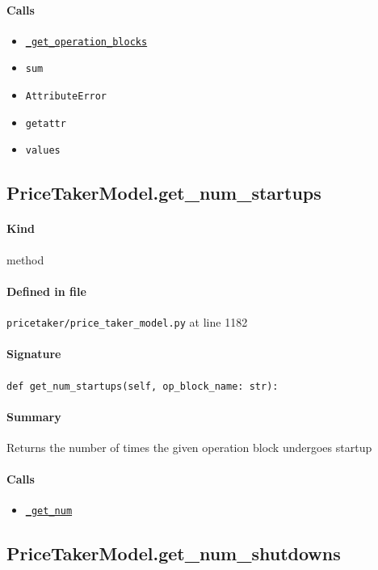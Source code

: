 \documentclass[11pt]{report}
\begin{document}
\paragraph{Calls}
\begin{itemize}[leftmargin=*]
  \item \hyperref[def:pricetaker-price_taker_model.py:PriceTakerModel._get_operation_blocks:L445]{\texttt{\_get\_operation\_blocks}}
  \item \texttt{sum}
  \item \texttt{AttributeError}
  \item \texttt{getattr}
  \item \texttt{values}
\end{itemize}
\subsection{PriceTakerModel.get\_num\_startups}
\label{def:pricetaker-price_taker_model.py:PriceTakerModel.get_num_startups:L1182}
\paragraph{Kind} method
\paragraph{Defined in file} \texttt{pricetaker/price\_taker\_model.py} at line 1182
\paragraph{Signature} \texttt{def get\_num\_startups(self, op\_block\_name: str):}
\paragraph{Summary} Returns the number of times the given operation block undergoes startup
\paragraph{Calls}
\begin{itemize}[leftmargin=*]
  \item \hyperref[def:pricetaker-price_taker_model.py:PriceTakerModel._get_num:L1155]{\texttt{\_get\_num}}
\end{itemize}
\subsection{PriceTakerModel.get\_num\_shutdowns}
\label{def:pricetaker-price_taker_model.py:PriceTakerModel.get_num_shutdowns:L1186}
\end{document}

